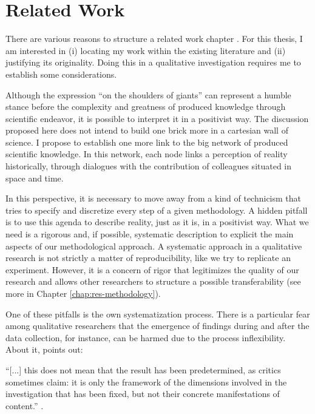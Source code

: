 \chapter{Related Work}
\label{chap:rel-work}

 There are various reasons to structure a related work chapter \cite[p.~14]{booth:2016-slr}. For this thesis, I am interested in (i) locating my work within the existing literature and (ii) justifying its originality. Doing this in a qualitative investigation requires me to establish some considerations.
 
Although the expression “on the shoulders of giants” can represent a humble stance before the complexity and greatness of produced knowledge through scientific endeavor, it is possible to interpret it in a positivist way. The discussion proposed here does not intend to build one brick more in a cartesian wall of science. I propose to establish one more link to the big network of produced scientific knowledge. In this network, each node links a perception of reality historically, through dialogues with the contribution of colleagues situated in space and time.

In this perspective, it is necessary to move away from a kind of technicism that tries to specify and discretize every step of a given methodology. A hidden pitfall is to use this agenda to describe reality, just as it is, in a positivist way. What we need is a rigorous and, if possible, systematic description to explicit the main aspects of our methodological approach. A systematic approach in a qualitative research is not strictly a matter of reproducibility, like we try to replicate an experiment. However, it is a concern of rigor that legitimizes the quality of our research and allows other researchers to structure a possible transferability (see more in Chapter \ref{chap:res-methodology}).

One of these pitfalls is the own systematization process. There is a particular fear among qualitative researchers that the emergence of findings during and after the data collection, for instance, can be harmed due to the process inflexibility. About it,  points out:
\begin{citacao}
    “[...] this does not mean that the result has been predetermined, as critics sometimes claim: it is only the framework of the dimensions involved in the investigation that has been fixed, but not their concrete manifestations of content.” \cite[p.~157]{meinefeld:2004}.
\end{citacao}

